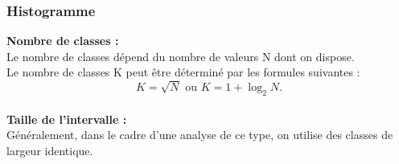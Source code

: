 \documentclass[10pt, french]{beamer}
\begin{document}
%

\begin{frame}\frametitle{Histogramme}
\textbf{Nombre de classes :}\\
Le nombre de classes dépend du nombre de valeurs N dont on dispose.\\
Le nombre de classes K peut être déterminé par les formules suivantes :
$$K=\sqrt{N} \text{ ou } K=1+\log _{2}N.$$\\
\textbf{Taille de l'intervalle :}\\
Généralement, dans le cadre d'une analyse de ce type,
on utilise des classes de largeur identique.\\
\end{frame}
\end{document}
